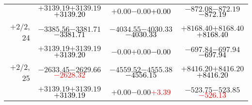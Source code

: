 \documentclass[compress]{beamer}
\begin{document}
\begin{frame}
{\begin{tabular}{r | c | c | c}
           & $+3139.19$\hspace{0.1 cm}$+3139.19$\hspace{0.1 cm}\textcolor{black}{$+3139.20$} & $+0.00$\hspace{0.1 cm}$-0.00$\hspace{0.1 cm}\textcolor{black}{$+0.00$} & $-872.08$\hspace{0.1 cm}$-872.19$\hspace{0.1 cm}\textcolor{black}{$-872.19$} \\
$+$2/2, 24 & $-3385.56$\hspace{0.1 cm}$-3381.71$\hspace{0.1 cm}\textcolor{black}{$-3381.71$} & $-4034.55$\hspace{0.1 cm}$-4030.33$\hspace{0.1 cm}\textcolor{black}{$-4030.33$} & $+8168.40$\hspace{0.1 cm}$+8168.40$\hspace{0.1 cm}\textcolor{black}{$+8168.40$} \\
           & $+3139.19$\hspace{0.1 cm}$+3139.19$\hspace{0.1 cm}\textcolor{black}{$+3139.20$} & $-0.00$\hspace{0.1 cm}$+0.00$\hspace{0.1 cm}\textcolor{black}{$-0.00$} & $-697.84$\hspace{0.1 cm}$-697.94$\hspace{0.1 cm}\textcolor{black}{$-697.94$} \\
$+$2/2, 25 & $-2633.45$\hspace{0.1 cm}$-2629.66$\hspace{0.1 cm}\textcolor{red}{$-2628.32$} & $-4559.52$\hspace{0.1 cm}$-4555.38$\hspace{0.1 cm}\textcolor{black}{$-4556.15$} & $+8416.20$\hspace{0.1 cm}$+8416.20$\hspace{0.1 cm}\textcolor{black}{$+8416.20$} \\
           & $+3139.19$\hspace{0.1 cm}$+3139.19$\hspace{0.1 cm}\textcolor{black}{$+3139.19$} & $+0.00$\hspace{0.1 cm}$-0.00$\hspace{0.1 cm}\textcolor{red}{$+3.39$} & $-523.75$\hspace{0.1 cm}$-523.85$\hspace{0.1 cm}\textcolor{red}{$-526.13$} \\

\end{tabular}}
\end{frame}
\end{document}
